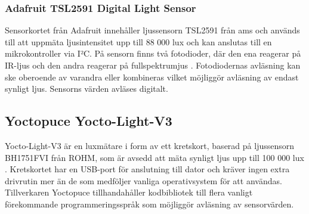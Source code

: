         \subsubsection{Adafruit TSL2591 Digital Light Sensor}
        \label{ssub:ada_tsl2591}
            Sensorkortet från Adafruit innehåller ljussensorn TSL2591 från ams och används till att uppmäta ljusintensitet upp till 88 000 lux och kan anslutas till en mikrokontroller via I²C. På sensorn finns två fotodioder, där den ena reagerar på IR-ljus och den andra reagerar på fullspektrumjus \cite{TSL2591}. Fotodiodernas avläsning kan ske oberoende av varandra eller kombineras vilket möjliggör avläsning av endast synligt ljus. Sensorns värden avläses digitalt.

    \subsection{Yoctopuce Yocto-Light-V3} %
    \label{sub:yocto}
        Yocto-Light-V3 är en luxmätare i form av ett kretskort, baserad på ljussensorn BH1751FVI från ROHM, som är avsedd att mäta synligt ljus upp till 100 000 lux \cite{yocto}. Kretskortet har en USB-port för anslutning till dator och kräver ingen extra drivrutin mer än de som medföljer vanliga operativsystem för att användas. Tillverkaren Yoctopuce tillhandahåller kodbibliotek till flera vanligt förekommande programmeringsspråk som möjliggör avläsning av sensorvärden.
